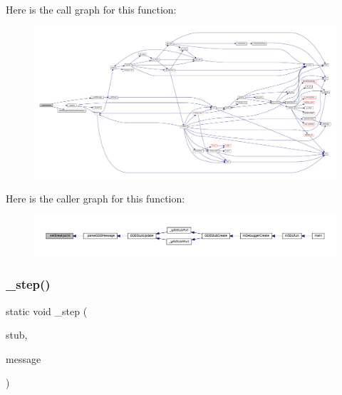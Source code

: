Here is the call graph for this function\+:
\nopagebreak
\begin{figure}[H]
\begin{center}
\leavevmode
\includegraphics[width=350pt]{gdb-stub_8c_a20d837c8c41a03d7d12d2af71302514f_cgraph}
\end{center}
\end{figure}
Here is the caller graph for this function\+:
\nopagebreak
\begin{figure}[H]
\begin{center}
\leavevmode
\includegraphics[width=350pt]{gdb-stub_8c_a20d837c8c41a03d7d12d2af71302514f_icgraph}
\end{center}
\end{figure}
\mbox{\label{gdb-stub_8c_ae28066e90628c8bf0560863573506b06}} 
\subsubsection{\texorpdfstring{\+\_\+step()}{\_step()}}
{\footnotesize\ttfamily static void \+\_\+step (\begin{DoxyParamCaption}\item[{struct G\+D\+B\+Stub $\ast$}]{stub,  }\item[{const char $\ast$}]{message }\end{DoxyParamCaption})\hspace{0.3cm}{\ttfamily [static]}}

